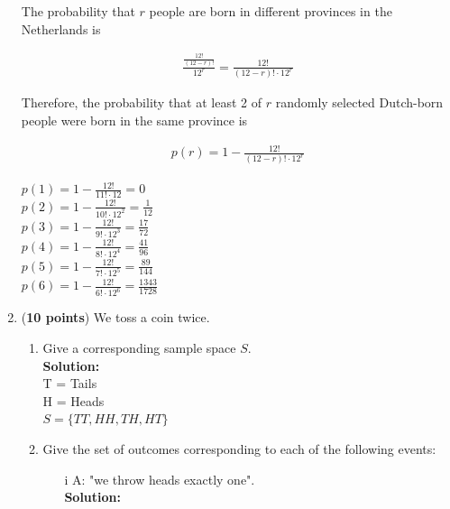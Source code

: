 \documentclass[a4paper]{article}
\begin{document}
\begin{enumerate}
The probability that $r$ people are born in different provinces in the Netherlands is 

\begin{align*}
	\frac{\frac{12!}{(12-r)!}}{12^r} = \frac{12!}{(12-r)! \cdot 12^r}
\end{align*}	

Therefore, the probability that at least 2 of $r$ randomly selected Dutch-born people were born in the same province is 

\begin{align*}
p(r) = 1 - \frac{12!}{(12-r)! \cdot 12^r}
\end{align*}
	

$p(1) = 1 - \frac{12!}{11! \cdot 12} = 0$\\
$p(2) = 1 - \frac{12!}{10! \cdot 12^2} = \frac{1}{12}$\\
$p(3) = 1 - \frac{12!}{9! \cdot 12^3} = \frac{17}{72} $\\
$p(4) = 1 - \frac{12!}{8! \cdot 12^4} = \frac{41}{96}$\\
$p(5) = 1 - \frac{12!}{7! \cdot 12^5} = \frac{89}{144}$\\
$p(6) = 1 - \frac{12!}{6! \cdot 12^6} = \frac{1343}{1728}$\\








\item (\textbf{10 points}) We toss a coin twice.\\


\begin{enumerate}
	\item Give a corresponding sample space $S$.\\
	\textbf{Solution:}\\
	
T = Tails\\
H = Heads\\

$S = \{TT,HH,TH,HT\}$\\	
	
	
	
	\item Give the set of outcomes corresponding to each of the following events:
	\begin{itemize}
		\item[i] A: "we throw heads exactly one".\\
		\textbf{Solution:}


\end{itemize}
\end{enumerate}
\end{enumerate}
\end{document}
